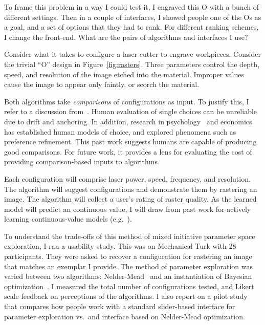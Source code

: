 To frame this problem in a way I could test it, I engraved this O with a bunch of different settings.
Then in a couple of interfaces, I showed people one of the Os as a goal, and a set of options that they had to rank.
For different ranking schemes, I change the front-end.
What are the pairs of algorithms and interfaces I use?

Consider what it takes to configure a laser cutter to engrave workpieces.
Consider the trivial ``O'' design in Figure~\ref{fig:rasters}.
Three parameters control the depth, speed, and resolution of the image etched into the material.
Improper values cause the image to appear only faintly, or scorch the material.
\fi

Both algorithms take \emph{comparisons} of configurations as input.
To justify this, I refer to a discussion from~\cite{brochu_tutorial_2010}.
Human evaluation of single choices can be unreliable due to drift and anchoring.
In addition, research in psychology~\cite{tversky_advances_1992} and economics~\cite{kingsley_preference_2006} has established human models of choice, and explored phenomena such as preference refinement.
This past work suggests humans are capable of producing good comparisons.
For future work, it provides a lens for evaluating the cost of providing comparison-based inputs to algorithms.

Each configuration will comprise laser power, speed, frequency, and resolution.
The algorithm will suggest configurations and demonstrate them by rastering an image.
The algorithm will collect a user's rating of raster quality.
As the learned model will predict an continuous value, I will draw from past work for actively learning continuous-value models (e.g.~\cite{sugiyama_active_2008}).
\fi

To understand the trade-offs of this method of mixed initiative parameter space exploration, I ran a usability study.
This was on Mechanical Turk with 28 participants.
They were asked to recover a configuration for rastering an image that matches an exemplar I provide.
The method of parameter exploration was varied between two algorithms: Nelder-Mead~\cite{nelder_simplex_1964} and an instantiation of Bayesian optimization~\cite{brochu_tutorial_2010}.
I measured the total number of configurations tested, and Likert scale feedback on perceptions of the algorithms.
I also report on a pilot study that compares how people work with a standard slider-based interface for parameter exploration vs.\ and interface based on Nelder-Mead optimization.
\fi
